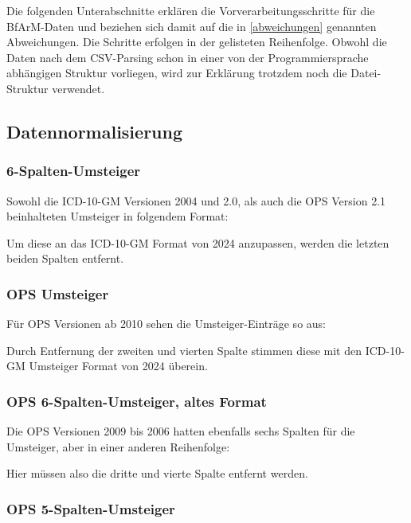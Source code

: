 Die folgenden Unterabschnitte erklären die Vorverarbeitungsschritte für die BfArM-Daten und beziehen sich damit auf die in \ref{abweichungen} genannten Abweichungen. Die Schritte erfolgen in der gelisteten Reihenfolge. Obwohl die Daten nach dem CSV-Parsing schon in einer von der Programmiersprache abhängigen Struktur vorliegen, wird zur Erklärung trotzdem noch die Datei-Struktur verwendet.

\subsection{Datennormalisierung}

\subsubsection{6-Spalten-Umsteiger}

Sowohl die ICD-10-GM Versionen 2004 und 2.0, als auch die OPS Version 2.1 beinhalteten Umsteiger in folgendem Format:


Um diese an das ICD-10-GM Format von 2024 anzupassen, werden die letzten beiden Spalten entfernt. 

\subsubsection{OPS Umsteiger}

Für OPS Versionen ab 2010 sehen die Umsteiger-Einträge so aus:


Durch Entfernung der zweiten und vierten Spalte stimmen diese mit den ICD-10-GM Umsteiger Format von 2024 überein. 

\subsubsection{OPS 6-Spalten-Umsteiger, altes Format}

Die OPS Versionen 2009 bis 2006 hatten ebenfalls sechs Spalten für die Umsteiger, aber in einer anderen Reihenfolge:


Hier müssen also die dritte und vierte Spalte entfernt werden. 

\subsubsection{OPS 5-Spalten-Umsteiger}

